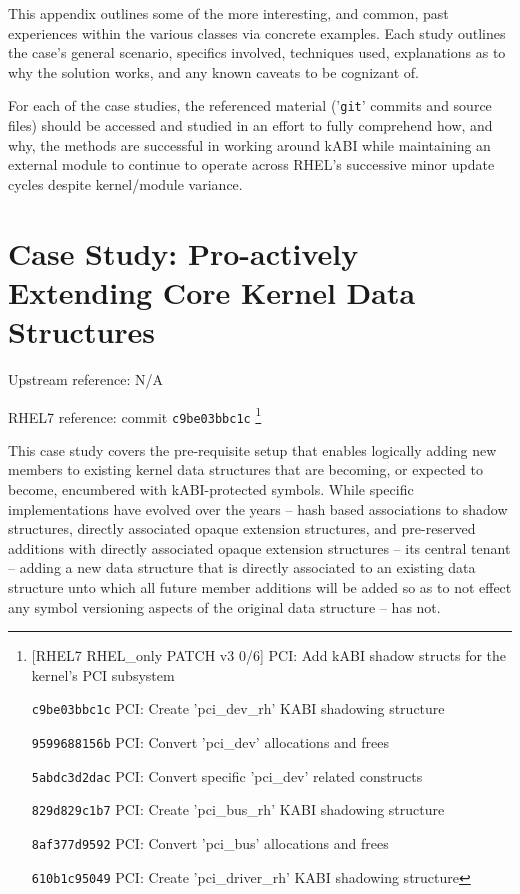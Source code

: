 \documentclass[10pt,oneside,english]{book}
\begin{document}
This appendix outlines some of the more interesting, and common, past
experiences within the various classes via concrete examples. Each
study outlines the case's general scenario, specifics involved, techniques
used, explanations as to why the solution works, and any known caveats
to be cognizant of.

For each of the case studies, the referenced material ('\texttt{git}'
commits and source files) should be accessed and studied in an effort
to fully comprehend how, and why, the methods are successful in working
around kABI while maintaining an external module to continue to operate
across RHEL's successive minor update cycles despite kernel/module
variance.

\section{Case Study: Pro-actively Extending Core Kernel Data Structures \label{sec:Case-Study:Pro-actively-Extending}}

Upstream reference: N/A

RHEL7 reference: commit \texttt{c9be03bbc1c} \footnote{\label{fn:a1}{[}RHEL7 RHEL\_only PATCH v3 0/6{]} PCI: Add kABI shadow
structs for the kernel's PCI subsystem

\texttt{c9be03bbc1c} PCI: Create 'pci\_dev\_rh' KABI shadowing structure

\texttt{9599688156b} PCI: Convert 'pci\_dev' allocations and frees

\texttt{5abdc3d2dac} PCI: Convert specific 'pci\_dev' related constructs

\texttt{829d829c1b7} PCI: Create 'pci\_bus\_rh' KABI shadowing structure

\texttt{8af377d9592} PCI: Convert 'pci\_bus' allocations and frees

\texttt{610b1c95049} PCI: Create 'pci\_driver\_rh' KABI shadowing
structure}

This case study covers the pre-requisite setup that enables logically
adding new members to existing kernel data structures that are becoming,
or expected to become, encumbered with kABI-protected symbols. While
specific implementations have evolved over the years -- hash based
associations to shadow structures, directly associated opaque extension
structures, and pre-reserved additions with directly associated opaque
extension structures -- its central tenant -- adding a new data
structure that is directly associated to an existing data structure
unto which all future member additions will be added so as to not
effect any symbol versioning aspects of the original data structure
-- has not.
\end{document}
